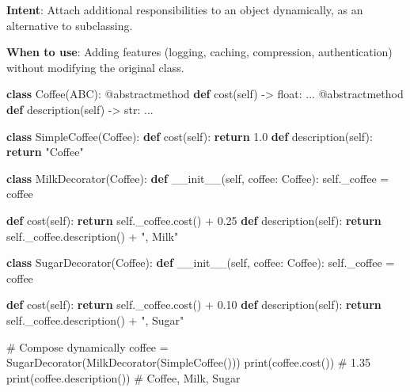 \documentclass[11pt]{article}
\newenvironment{Shaded}{\begin{snugshade}}{\end{snugshade}}
\newcommand{\AttributeTok}[1]{\textcolor[rgb]{0.16,0.50,0.73}{#1}}
\newcommand{\BuiltInTok}[1]{\textcolor[rgb]{0.50,0.55,0.55}{#1}}
\newcommand{\CommentTok}[1]{\textcolor[rgb]{0.48,0.49,0.49}{#1}}
\newcommand{\ControlFlowTok}[1]{\textcolor[rgb]{0.99,0.74,0.29}{\textbf{#1}}}
\newcommand{\FloatTok}[1]{\textcolor[rgb]{0.96,0.45,0.00}{#1}}
\newcommand{\FunctionTok}[1]{\textcolor[rgb]{0.56,0.27,0.68}{#1}}
\newcommand{\KeywordTok}[1]{\textcolor[rgb]{0.81,0.81,0.76}{\textbf{#1}}}
\newcommand{\NormalTok}[1]{\textcolor[rgb]{0.81,0.81,0.76}{#1}}
\newcommand{\OperatorTok}[1]{\textcolor[rgb]{0.81,0.81,0.76}{#1}}
\newcommand{\StringTok}[1]{\textcolor[rgb]{0.96,0.31,0.31}{#1}}
\newcommand{\VariableTok}[1]{\textcolor[rgb]{0.15,0.68,0.68}{#1}}
\begin{document}
\textbf{Intent}: Attach additional responsibilities to an object dynamically, as an alternative to subclassing.

\textbf{When to use}: Adding features (logging, caching, compression, authentication) without modifying the original class.


\begin{Shaded}
\begin{Highlighting}[]
\KeywordTok{class}\NormalTok{ Coffee(ABC):}
    \AttributeTok{@abstractmethod}
    \KeywordTok{def}\NormalTok{ cost(}\VariableTok{self}\NormalTok{) }\OperatorTok{{-}\textgreater{}} \BuiltInTok{float}\NormalTok{: ...}
    \AttributeTok{@abstractmethod}
    \KeywordTok{def}\NormalTok{ description(}\VariableTok{self}\NormalTok{) }\OperatorTok{{-}\textgreater{}} \BuiltInTok{str}\NormalTok{: ...}

\KeywordTok{class}\NormalTok{ SimpleCoffee(Coffee):}
    \KeywordTok{def}\NormalTok{ cost(}\VariableTok{self}\NormalTok{): }\ControlFlowTok{return} \FloatTok{1.0}
    \KeywordTok{def}\NormalTok{ description(}\VariableTok{self}\NormalTok{): }\ControlFlowTok{return} \StringTok{"Coffee"}

\KeywordTok{class}\NormalTok{ MilkDecorator(Coffee):}
    \KeywordTok{def} \FunctionTok{\_\_init\_\_}\NormalTok{(}\VariableTok{self}\NormalTok{, coffee: Coffee):}
        \VariableTok{self}\NormalTok{.\_coffee }\OperatorTok{=}\NormalTok{ coffee}

    \KeywordTok{def}\NormalTok{ cost(}\VariableTok{self}\NormalTok{): }\ControlFlowTok{return} \VariableTok{self}\NormalTok{.\_coffee.cost() }\OperatorTok{+} \FloatTok{0.25}
    \KeywordTok{def}\NormalTok{ description(}\VariableTok{self}\NormalTok{): }\ControlFlowTok{return} \VariableTok{self}\NormalTok{.\_coffee.description() }\OperatorTok{+} \StringTok{", Milk"}

\KeywordTok{class}\NormalTok{ SugarDecorator(Coffee):}
    \KeywordTok{def} \FunctionTok{\_\_init\_\_}\NormalTok{(}\VariableTok{self}\NormalTok{, coffee: Coffee):}
        \VariableTok{self}\NormalTok{.\_coffee }\OperatorTok{=}\NormalTok{ coffee}

    \KeywordTok{def}\NormalTok{ cost(}\VariableTok{self}\NormalTok{): }\ControlFlowTok{return} \VariableTok{self}\NormalTok{.\_coffee.cost() }\OperatorTok{+} \FloatTok{0.10}
    \KeywordTok{def}\NormalTok{ description(}\VariableTok{self}\NormalTok{): }\ControlFlowTok{return} \VariableTok{self}\NormalTok{.\_coffee.description() }\OperatorTok{+} \StringTok{", Sugar"}

\CommentTok{\# Compose dynamically}
\NormalTok{coffee }\OperatorTok{=}\NormalTok{ SugarDecorator(MilkDecorator(SimpleCoffee()))}
\BuiltInTok{print}\NormalTok{(coffee.cost())          }\CommentTok{\# 1.35}
\BuiltInTok{print}\NormalTok{(coffee.description())   }\CommentTok{\# Coffee, Milk, Sugar}
\end{Highlighting}
\end{Shaded}
\end{document}

